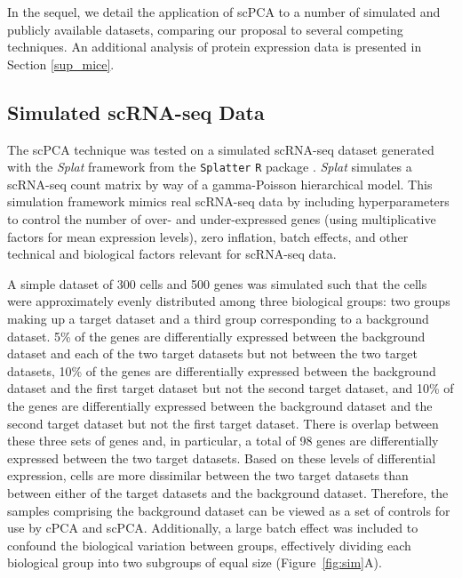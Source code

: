 In the sequel, we detail the application of scPCA to a number of simulated and publicly available datasets, comparing our proposal to several competing techniques. An additional analysis of protein expression data is presented in Section \ref{sup_mice}. 

\subsection{Simulated scRNA-seq Data}\label{sim_scRNA-seq}

The scPCA technique was tested on a simulated scRNA-seq dataset generated with the \textit{Splat} framework from the \texttt{Splatter} \texttt{R} package  \citep{Zappia2017}. \textit{Splat} simulates a scRNA-seq count matrix by way of a gamma-Poisson hierarchical model. This simulation framework mimics real scRNA-seq data by including hyperparameters to control the number of over- and under-expressed genes (using multiplicative factors for mean expression levels), zero inflation, batch effects, and other technical and biological factors relevant for scRNA-seq data.

A simple dataset of 300 cells and 500 genes was simulated such that the cells were approximately evenly distributed among three biological groups: two groups making up a target dataset and a third group corresponding to a background dataset. 5\% of the genes are differentially expressed between the background dataset and each of the two target datasets but not between the two target datasets, 10\% of the genes are differentially expressed between the background dataset and the first target dataset but not the second target dataset, and 10\% of the genes are differentially expressed between the background dataset and the second target dataset but not the first target dataset. There is overlap between these three sets of genes and, in particular, a total of 98 genes are differentially expressed between the two target datasets. Based on these levels of differential expression, cells are more dissimilar between the two target datasets than between either of the target datasets and the background dataset. Therefore, the samples comprising the background dataset can be viewed as a set of controls for use by cPCA and scPCA. Additionally, a large batch effect was included to confound the biological variation between groups, effectively dividing each biological group into two subgroups of  equal size (Figure~\ref{fig:sim}A).

